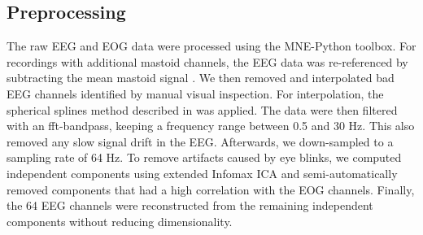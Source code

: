 \subsection*{Preprocessing}
The raw EEG and EOG data were processed using the MNE-Python toolbox. 
For recordings with additional mastoid channels, the EEG data was re-referenced by subtracting the mean mastoid signal \cite{teplan_fundamentals_2002}.
We then removed and interpolated bad EEG channels identified by manual visual inspection.
For interpolation, the spherical splines method described in \cite{perrin_spherical_1989} was applied.
The data were then filtered with an fft-bandpass, keeping a frequency range between 0.5 and 30 Hz.
This also removed any slow signal drift in the EEG.
Afterwards, we down-sampled to a sampling rate of 64 Hz.
To remove artifacts caused by eye blinks, we computed independent components using extended Infomax \ac{ICA} \cite{lee_independent_1999} and semi-automatically removed components that had a high correlation with the EOG channels.
Finally, the 64 EEG channels were reconstructed from the remaining independent components without reducing dimensionality.
